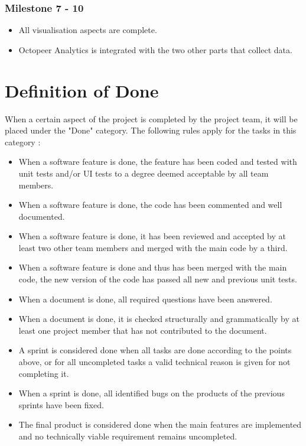 \documentclass{article}
\begin{document}
    \subsubsection{Milestone 7 - 10}
    \begin{itemize}
        \item All visualisation aspects are complete.
        \item Octopeer Analytics is integrated with the two other parts that collect data.
    \end{itemize}
    
\section{Definition of Done}

When a certain aspect of the project is completed by the project team, it will be placed under the "Done" category. The following rules apply for the tasks in this category : 

\begin{itemize}
    \item When a software feature is done, the feature has been coded and tested with unit tests and/or UI tests to a degree deemed acceptable by all team members.
    \item When a software feature is done, the code has been commented and well documented.
    \item When a software feature is done, it has been reviewed and accepted by at least two other team members and merged with the main code by a third.
    \item When a software feature is done and thus has been merged with the main code, the new version of the code has passed all new and previous unit tests.
    \item When a document is done, all required questions have been answered.
    \item When a document is done, it is checked structurally and grammatically by at least one project member that has not contributed to the document.
    \item A sprint is considered done when all tasks are done according to the points above, or for all uncompleted tasks a valid technical reason is given for not completing it.
    \item When a sprint is done, all identified bugs on the products of the previous sprints have been fixed.
    \item The final product is considered done when the main features are implemented and no technically viable requirement remains uncompleted.
\end{itemize}
\end{document}
